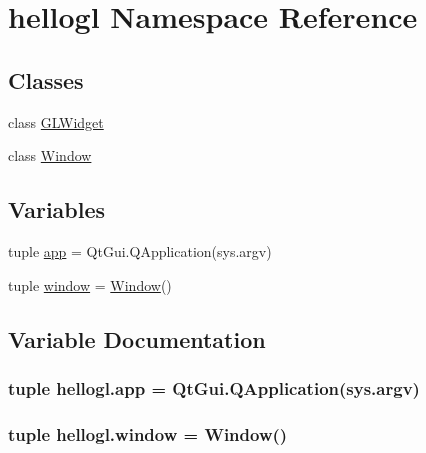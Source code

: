 \hypertarget{namespacehellogl}{}\section{hellogl Namespace Reference}
\label{namespacehellogl}
\subsection*{Classes}
\begin{DoxyCompactItemize}
\item 
class \hyperlink{classhellogl_1_1GLWidget}{G\+L\+Widget}
\item 
class \hyperlink{classhellogl_1_1Window}{Window}
\end{DoxyCompactItemize}
\subsection*{Variables}
\begin{DoxyCompactItemize}
\item 
tuple \hyperlink{namespacehellogl_a120609ba659c1c8aed507e75f11e67f5}{app} = Qt\+Gui.\+Q\+Application(sys.\+argv)
\item 
tuple \hyperlink{namespacehellogl_afc40c4cfae2ec35e39aab158786ce529}{window} = \hyperlink{classhellogl_1_1Window}{Window}()
\end{DoxyCompactItemize}


\subsection{Variable Documentation}
\hypertarget{namespacehellogl_a120609ba659c1c8aed507e75f11e67f5}{}
\subsubsection[{app}]{\setlength{\rightskip}{0pt plus 5cm}tuple hellogl.\+app = Qt\+Gui.\+Q\+Application(sys.\+argv)}\label{namespacehellogl_a120609ba659c1c8aed507e75f11e67f5}
\hypertarget{namespacehellogl_afc40c4cfae2ec35e39aab158786ce529}{}
\subsubsection[{window}]{\setlength{\rightskip}{0pt plus 5cm}tuple hellogl.\+window = {\bf Window}()}\label{namespacehellogl_afc40c4cfae2ec35e39aab158786ce529}
